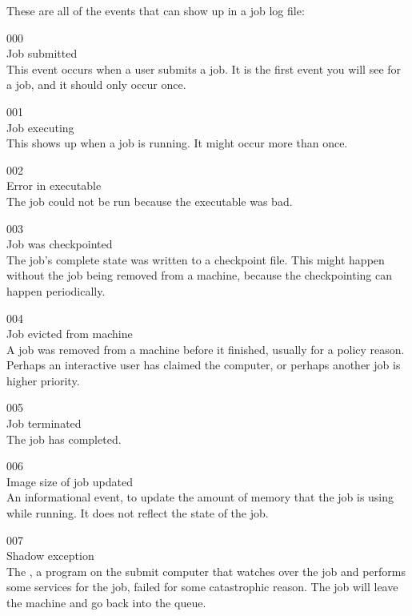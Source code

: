 These are all of the events that can show up in a job log file:

\noindent{} 000 \\
 Job submitted \\
 This event occurs when a user submits a job.
It is the first event you will see for a job, and it should only occur
once. 

\noindent{} 001 \\
 Job executing \\
 This shows up when a job is running.
It might occur more than once.

\noindent{} 002 \\
 Error in executable \\
 The job could not be run because the
executable was bad.

\noindent{} 003 \\
 Job was checkpointed \\
 The job's complete state was written to a checkpoint
file.  
This might happen without the job being removed from a machine,
because the checkpointing can happen periodically. 

\noindent{} 004 \\
 Job evicted from machine \\
 A job was removed from a machine before it finished,
usually for a policy reason. Perhaps an interactive user has claimed
the computer, or perhaps another job is higher priority.

\noindent{} 005 \\
 Job terminated \\
 The job has completed.

\noindent{} 006 \\
 Image size of job updated \\
 An informational event, 
to update the amount of memory that the job is using while running. 
It does not reflect the state of the job.

\noindent{} 007 \\
 Shadow exception \\
The , a program on the submit computer that watches
over the job and performs some services for the job, failed for some
catastrophic reason. The job will leave the machine and go back into
the queue.

